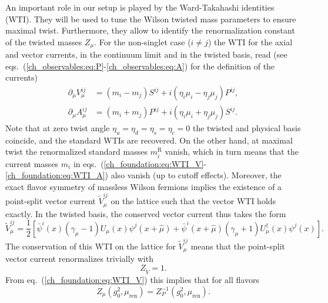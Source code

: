 An important role in our setup is played by the Ward-Takahashi identities (WTI). They will be used to tune the Wilson twisted mass parameters to ensure maximal twist. Furthermore, they allow to identify the renormalization constant of the twisted masses $Z_{\mu}$. For the non-singlet case ($i\neq j$) the WTI for the axial and vector currents, in the continuum limit and in the twisted basis, read (see eqs.~(\ref{ch_observables:eq:P}-\ref{ch_observables:eq:A}) for the definition of the currents)
\begin{align}
\label{ch_foundation:eq:WTI_V}
\partial_{\mu}V_{\mu}^{ij}&=(m_i-m_j)S^{ij}+i(\eta_i\mu_i-\eta_j\mu_j)P^{ij},\\
\label{ch_foundation:eq:WTI_A}
\partial_{\mu}A_{\mu}^{ij}&=(m_i+m_j)P^{ij}+i(\eta_i\mu_i+\eta_j\mu_j)S^{ij}.
\end{align}
Note that at zero twist angle $\eta_u=\eta_d=\eta_s=\eta_c=0$ the twisted and physical basis coincide, and the standard WTIs are recovered. On the other hand, at maximal twist the renormalized standard masses $m_i^{\textrm{R}}$ vanish, which in turn means that the current masses $m_{i}$ in eqs.~(\ref{ch_foundation:eq:WTI_V}-\ref{ch_foundation:eq:WTI_A}) also vanish (up to cutoff effects). Moreover, the exact flavor symmetry of massless Wilson fermions implies the existence of a point-split vector current $\tilde{V}_{\mu}^{ij}$ on the lattice such that the vector WTI holds exactly. In the twisted basis, the conserved vector current thus takes the form
\begin{equation}
\label{ch_foundation:eq:V_split}
\tilde{V}_{\mu}^{ij}=\frac{1}{2}\left[\bar{\psi}^i(x)(\gamma_{\mu}-1)U_{\mu}(x)\psi^j(x+\hat{\mu})+\bar{\psi}^i(x+\hat{\mu})(\gamma_{\mu}+1)U_{\mu}^{\dagger}(x)\psi^j(x)\right].
\end{equation}
The conservation of this WTI on the lattice for $\tilde{V}_{\mu}^{ij}$ means that the point-split vector current renormalizes trivially with
\begin{equation}
\label{ch_foundation:eq:ZV=1}
Z_{\tilde{V}}=1.
\end{equation}
From eq.~(\ref{ch_foundation:eq:WTI_V}) this implies that for all flavors
\begin{equation}
\label{ch_foundation:eq:Zmu}
Z_{\mu}(g_0^2,\mu_{\textrm{ren}})=Z_P^{-1}(g_0^2,\mu_{\textrm{ren}}).
\end{equation}



